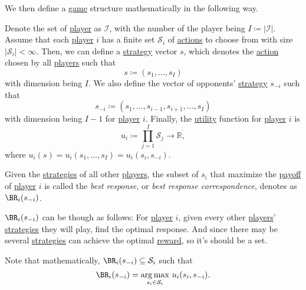 We then define a \hyperref[def:game]{game} structure mathematically in the following way.
\begin{definition}\label{def:mathematical-game}
	Denote the set of \hyperref[def:player]{player} as \(\mathcal{I}\), with the number of the player being \(I\coloneqq \left\vert \mathcal{I} \right\vert \). Assume that each \hyperref[def:player]{player} \(i\) has a finite set \(\mathcal{S}_i\) of \hyperref[def:strategy]{actions} to choose from with size \(\left\vert \mathcal{S}_i \right\vert<\infty  \). Then, we can define a \hyperref[def:strategy]{strategy} vector \(s\), which denotes the \hyperref[def:strategy]{action} chosen by all \hyperref[def:player]{players} such that
	\[
		s\coloneqq (s_1, \dots , s_I)
	\]
	with dimension being \(I\). We also define the vector of opponents' \hyperref[def:strategy]{strategy} \(s_{-i}\) such that
	\[
		s_{-i}\coloneqq (s_1,\dots,s_{i - 1},s_{i + 1} ,\dots,s_I)
	\]
	with dimension being \(I - 1\) for \hyperref[def:player]{player} \(i\). Finally, the \hyperref[def:reward]{utility} function for \hyperref[def:player]{player} \(i\) is
	\[
		u_{i} \coloneqq \prod\limits_{j = 1}^{I} \mathcal{S}_j \to \mathbb{R},
	\]
	where \(u_{i}(s) = u_{i}(s_1, \dots , s_I) = u_{i}(s_{i}, s_{-i})\).
\end{definition}

\begin{definition}\label{def:best-response}
	Given the \hyperref[def:strategy]{strategies} of all other \hyperref[def:player]{players}, the subset of \(s_{i}\) that maximize the \hyperref[def:reward]{payoff} of \hyperref[def:player]{player} \(i\) is called the \emph{best response}, or \emph{best response correspondence}, denotes as \(\BR_i(s_{-i})\).
\end{definition}

\begin{intuition}
	\(\BR_i(s_{-i})\) can be though as follows: For \hyperref[def:player]{player} \(i\), given every other \hyperref[def:player]{players}' \hyperref[def:strategy]{strategies} they will play, find the optimal response. And since there may be several \hyperref[def:strategy]{strategies} can achieve the optimal \hyperref[def:reward]{reward}, so it's should be a set.
\end{intuition}

\begin{remark}
	Note that mathematically, \(\BR_i(s_{-i}) \subseteq \mathcal{S}_i\) such that
	\[
		\BR_i(s_{-i})= \underset{s_{i}\in\mathcal{S}_i}{\arg\max}\ u_{i}(s_{i}, s_{-i}).
	\]
\end{remark}